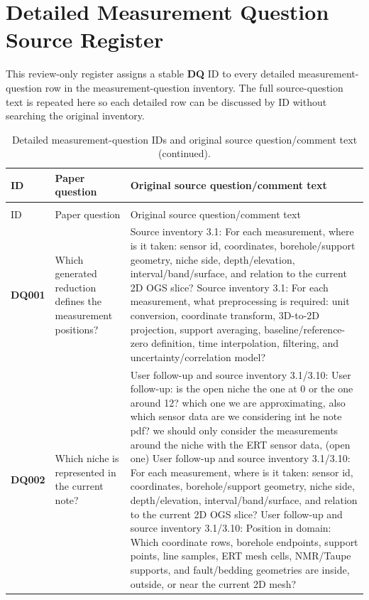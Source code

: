 \section*{Detailed Measurement Question Source Register}
This review-only register assigns a stable \textbf{DQ} ID to every detailed measurement-question row in the measurement-question inventory.  The full source-question text is repeated here so each detailed row can be discussed by ID without searching the original inventory.\par\medskip
\scriptsize
\renewcommand{\arraystretch}{1.10}
\begin{longtable}{@{}L{0.09\textwidth} L{0.31\textwidth} L{0.52\textwidth}@{}}
\caption{Detailed measurement-question IDs and original source question/comment text.}\label{tab:detailed-measurement-question-source-register}\\
\toprule
ID & Paper question & Original source question/comment text\\
\midrule
\endfirsthead
\caption[]{Detailed measurement-question IDs and original source question/comment text (continued).}\\
\toprule
ID & Paper question & Original source question/comment text\\
\midrule
\endhead
\bottomrule
\endlastfoot
\textbf{DQ001} & Which generated reduction defines the measurement positions? & Source inventory 3.1: For each measurement, where is it taken: sensor id, coordinates, borehole/support geometry, niche side, depth/elevation, interval/band/surface, and relation to the current 2D OGS slice? Source inventory 3.1: For each measurement, what preprocessing is required: unit conversion, coordinate transform, 3D-to-2D projection, support averaging, baseline/reference-zero definition, time interpolation, filtering, and uncertainty/correlation model?\\
\addlinespace[0.18em]
\textbf{DQ002} & Which niche is represented in the current note? & User follow-up and source inventory 3.1/3.10: User follow-up: is the open niche the one at 0 or the one around 12? which one we are approximating, also which sensor data are we considering int he note pdf? we should only consider the measurements around the niche with the ERT sensor data, (open one) User follow-up and source inventory 3.1/3.10: For each measurement, where is it taken: sensor id, coordinates, borehole/support geometry, niche side, depth/elevation, interval/band/surface, and relation to the current 2D OGS slice? User follow-up and source inventory 3.1/3.10: Position in domain: Which coordinate rows, borehole endpoints, support points, line samples, ERT mesh cells, NMR/Taupe supports, and fault/bedding geometries are inside, outside, or near the current 2D mesh?\\

\end{longtable}
